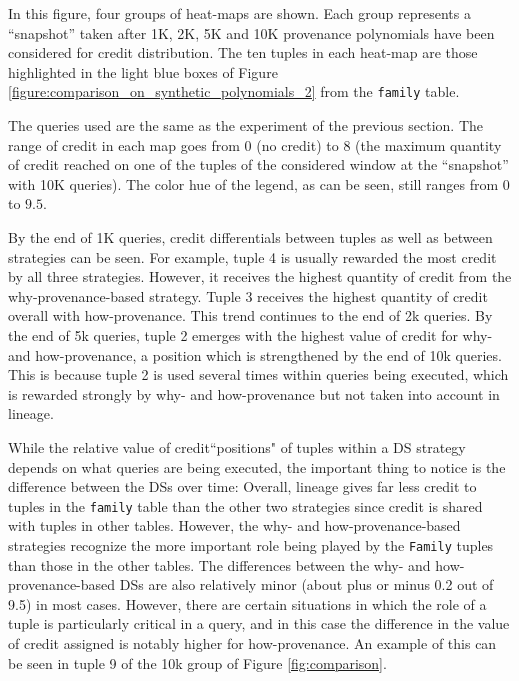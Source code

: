 In this figure, four groups of heat-maps are shown. Each group represents a ``snapshot'' taken %
after 1K, 2K, 5K and 10K provenance polynomials have been considered for credit distribution.  
The ten tuples in each heat-map  %
are those  highlighted in the light blue boxes of Figure \ref{figure:comparison_on_synthetic_polynomials_2} from the \texttt{family} table.  


The queries used are the same as the experiment of the previous section. The range of credit in each map goes from 0 (no credit) to 8 (the maximum quantity of credit reached on one of the tuples of the considered window at the ``snapshot'' with 10K queries). The color hue of the legend, as can be seen, still ranges from $0$ to $9.5$.


By the end of 1K queries, credit differentials between tuples as well as between strategies can be seen.  For example, \textcolor{correction}{tuple 4 is usually rewarded the most credit by all three strategies. However, it receives the highest quantity of credit from the why-provenance-based strategy. Tuple 3 receives the highest quantity of credit overall with how-provenance.}
This trend continues to the end of 2k queries.
By the end of 5k queries, tuple 2 emerges with the highest value of credit for why- and how-provenance, a position which is strengthened by the end of 10k queries. This is because tuple 2 is used several times within queries being executed, which is rewarded strongly by why- and how-provenance but not taken into account in lineage.

While the relative value of credit``positions" of tuples within a DS strategy depends on what queries are being executed, the important thing to notice is the difference between the DSs over time:  Overall, lineage gives far less credit to tuples in the \texttt{family} table than the other two strategies since credit is  shared with tuples in other tables.
However, the why- and how-provenance-based strategies recognize the more important role being played by the \texttt{Family} tuples than those in the other tables.
The differences between the why- and how-provenance-based DSs are also relatively minor (about plus or minus 0.2 out of 9.5) in most cases. However, there are certain situations in which the role of a tuple is particularly critical in a query, and in this case the difference in the value of credit assigned is notably higher for how-provenance.  An example of this can be seen in tuple 9 of the 10k group of Figure \ref{fig:comparison}. 



